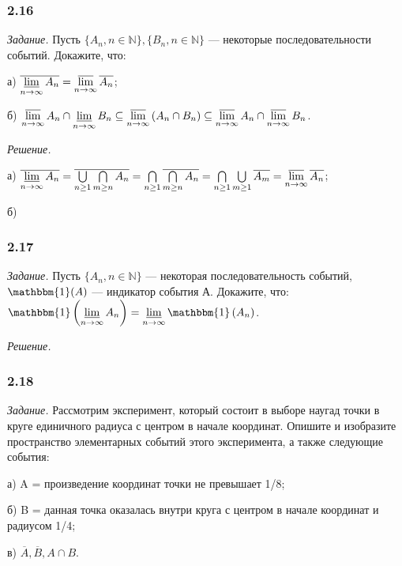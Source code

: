 \documentclass{book}
\begin{document}
\subsubsection*{2.16}

\textit{Задание.} Пусть $\{A_n, n\in\mathbb{N}\}, \{B_n, n\in\mathbb{N}\}$ --- некоторые последовательности событий. Докажите, что:

а) $\overline{\varliminf\limits_{n\to\infty}A_n}=\varlimsup\limits_{n\to\infty}\overline{A_n}$;

б) $\varlimsup\limits_{n\to\infty}A_n\cap\varliminf\limits_{n\to\infty}B_n\subseteq\varlimsup\limits_{n\to\infty}\left(A_n\cap B_n\right)\subseteq\varlimsup\limits_{n\to\infty}A_n\cap\varlimsup\limits_{n\to\infty}B_n$.

\textit{Решение.}

а) $\overline{\varliminf\limits_{n\to\infty}A_n}=\overline{\bigcup\limits_{n\geq 1}\bigcap\limits_{m\geq n}A_n}=\bigcap\limits_{n\geq 1}\overline{\bigcap\limits_{m\geq n}A_n}=\bigcap\limits_{n\geq 1}\bigcup\limits_{m\geq 1}\overline{A_m}=\varlimsup\limits_{n\to\infty}\overline{A_n}$;

б)

\subsubsection*{2.17}

\textit{Задание.} Пусть $\{A_n, n\in\mathbb{N}\}$ --- некоторая последовательность событий, $\mathbbm{1}(A)$ --- индикатор события А. Докажите, что: $\mathbbm{1}\left(\varliminf\limits_{n\to\infty}A_n\right)=\varliminf\limits_{n\to\infty}\mathbbm{1}\left(A_n\right)$.

\textit{Решение.}

\subsubsection*{2.18}

\textit{Задание.} Рассмотрим эксперимент, который состоит в выборе наугад точки в круге единичного радиуса с центром в начале координат. Опишите и изобразите пространство элементарных событий этого эксперимента, а также следующие события:

а) A = {произведение координат точки не превышает 1/8};

б) B = {данная точка оказалась внутри круга с центром в начале координат и радиусом 1/4};

в) $\overline{A}, \overline{B}, A\cap B$.
\end{document}
